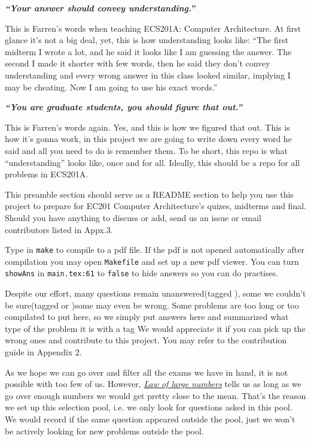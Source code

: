 
\textbf{\textit{``Your answer should convey understanding.''}}

This is Farren's words when teaching ECS201A: Computer Architecture.
At first glance it's not a big deal, yet, this is how understanding looks like: 
``The first midterm I wrote a lot, and he said it looks like I am guessing the answer.
The second I made it shorter with few words, then he said they don't convey understanding and every wrong answer in this class looked similar, implying I may be cheating.
Now I am going to use his exact words.''

\textbf{\textit{``You are graduate students, you should figure that out.''}}

This is Farren's words again. 
Yes, and this \name is how we figured that out.
This is how it's gonna work, in this project we are going to write down every word he said and all you need to do is remember them.
To be short, this repo is what ``understanding'' looks like, once and for all.
Ideally, this should be a repo for all problems in ECS201A.

This preamble section should serve as a README section to help you use this project to prepare for EC201 Computer Architecture's quizes, midterms and final.
Should you have anything to discuss or add, send us an issue or email contributors listed in Appx.3.


Type in \lstinline{make} to compile to a pdf file.
If the pdf is not opened automatically after compilation you may open \texttt{Makefile} and set up a new pdf viewer.
You can turn \lstinline{showAns} in \texttt{main.tex:61} to \lstinline{false} to hide answers so you can do practises.

Despite our effort, many questions remain unanswered(tagged \todo), some we couldn't be sure(tagged \warn{} or \OR)some may even be wrong.
Some problems are too long or too compilated to put here, so we simply put answers here and summarized what type of the problem it is with a tag \info{} 
We would appreciate it if you can pick up the wrong ones and contribute to this project.
You may refer to the contribution guide in Appendix 2.


As we hope we can go over and filter all the exams we have in hand, it is not possible with too few of us.
However, \href{https://en.wikipedia.org/wiki/Law_of_large_numbers}{\textit{Law of large numbers}} tells us as long as we go over enough numbers we would get pretty close to the mean.
That's the reason we set up this selection pool, i.e. we only look for questions asked in this pool. 
We would record if the same question appeared outside the pool, just we won't be actively looking for new problems outside the pool.

